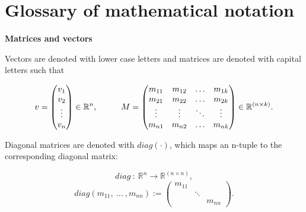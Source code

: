 \newpage
\section*{Glossary of mathematical notation}

\textbf{Matrices and vectors}

Vectors are denoted with lower case letters and matrices are denoted with capital letters such that

\vspace{-6mm}
 \begin{equation*}
 v = 
 \begin{pmatrix}

 		 v_1 	\\
		 v_2 	\\
 		 \vdots \\
		 v_n

 \end{pmatrix}
 \in {\mathbb{R}}^{n},
 \hspace{10mm}
 M = 
 \begin{pmatrix}

 		 m_{11} & m_{12} & \hdots & m_{1k}	\\
 		 m_{21} & m_{22} & \hdots & m_{2k}	\\
 		 \vdots & \vdots & \ddots & \vdots	\\
 		 m_{n1} & m_{n2} & \hdots &m_{nk} \\

 \end{pmatrix}
 \in {\mathbb{R}}^{(n \times k)}.
 \end{equation*}
 \vspace{-3mm}

Diagonal matrices are denoted with $diag(\cdot)$, which maps an n-tuple to the corresponding diagonal matrix:
\vspace{-5mm}

\begin{equation*}
diag \: : \: \mathbb{R}^{n} \rightarrow \mathbb{R}^{(n \times n)},
\end{equation*}
\begin{equation*}
diag(m_{11},\: ... \:, m_{nn} ) := 
\begin{pmatrix}
    m_{11} & & \\
    & \ddots & \\
    & & m_{nn}
  \end{pmatrix}.
  \end{equation*}
  \vspace{-3mm}

